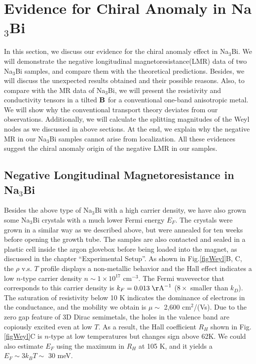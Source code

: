 \section{Evidence for Chiral Anomaly in Na$_3$Bi}
\label{sec:na3bi:chiral}

In this section, we discuss our evidence for the chiral anomaly effect in Na$_3$Bi. We will demonstrate the negative longitudinal magnetoresistance(LMR) data of two Na$_3$Bi samples, and compare them with the theoretical predictions. Besides, we will discuss the unexpected results obtained and their possible reasons. Also, to compare with the MR data of Na$_3$Bi, we will present the resistivity and conductivity tensors in a tilted $\bf B$ for a conventional one-band anisotropic metal. We will show why the conventional transport theory deviates from our observations. Additionally, we will calculate the splitting magnitudes of the Weyl nodes as we discussed in above sections. At the end, we explain why the negative MR in our Na$_3$Bi samples cannot arise from localization. All these evidences suggest the chiral anomaly origin of the negative LMR in our samples.


\subsection{Negative Longitudinal Magnetoresistance in Na$_3$Bi}

Besides the above type of Na$_3$Bi with a high carrier density, we have also grown some Na$_3$Bi crystals with a much lower Fermi energy $E_F$. The crystals were grown in a similar way as we described above, but were annealed for ten weeks before opening the growth tube. The samples are also contacted and sealed in a plastic cell inside the argon glovebox before being loaded into the magnet, as discussed in the chapter ``Experimental Setup''. As shown in Fig.\ref{figWeyl}B, C, the $\rho$ v.s. $T$ profile displays a non-metallic behavior and the Hall effect indicates a low $n$-type carrier density $n\sim 1\times 10^{17}$ cm$^{-3}$. The Fermi wavevector that corresponds to this carrier density is $k_F = 0.013 \;\rm{\AA}^{-1}$ ($8\times$ smaller than $k_D$). The saturation of resistivity below 10 K indicates the dominance of electrons in the conductance, and the mobility we obtain is $\mu\sim$ 2,600 cm$^2$/(Vs). Due to the zero gap feature of 3D Dirac semimetals, the holes in the valence band are copiously excited even at low $T$. As a result, the Hall coefficient $R_H$ shown in Fig. \ref{figWeyl}C is $n$-type at low temperatures but changes sign above 62K. We could also estimate $E_F$ using the maximum in $R_H$ at 105 K, and it yields a $E_F\sim 3k_BT\sim$ 30 meV. 

